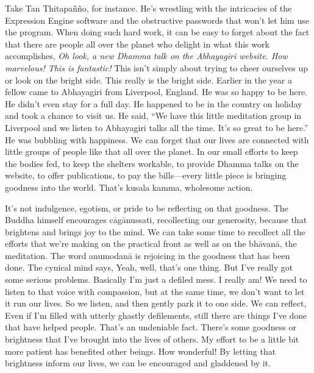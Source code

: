Take Tan Thitapañño, for instance. He's wrestling with the 
intricacies of the Expression Engine software and the obstructive 
passwords that won't let him use the program. When doing such hard 
work, it can be easy to forget about the fact that there are people all 
over the planet who delight in what this work accomplishes, \emph{Oh 
look, a new Dhamma talk on the Abhayagiri website. How marvelous! This 
is fantastic!} This isn't simply about trying to cheer ourselves up or 
look on the bright side. This really is the bright side. Earlier in the 
year a fellow came to Abhayagiri from Liverpool, England. He was so 
happy to be here. He didn't even stay for a full day. He happened to be 
in the country on holiday and took a chance to visit us. He said, ``We 
have this little meditation group in Liverpool and we listen to 
Abhayagiri talks all the time. It's so great to be here.'' He was 
bubbling with happiness. We can forget that our lives are connected 
with little groups of people like that all over the planet. In our 
small efforts to keep the bodies fed, to keep the shelters workable, to 
provide Dhamma talks on the website, to offer publications, to pay the 
bills---every little piece is bringing goodness into the world. That's 
kusala kamma, wholesome action.

It's not indulgence, egotism, or pride to be reflecting on that 
goodness. The Buddha himself encourages cāgānussati, recollecting our 
generosity, because that brightens and brings joy to the mind. We can 
take some time to recollect all the efforts that we're making on the 
practical front as well as on the bhāvanā, the meditation. The word 
anumodanā is rejoicing in the goodness that has been done. The cynical 
mind says, Yeah, well, that's one thing. But I've really got some 
serious problems. Basically I'm just a defiled mess. I really am! We 
need to listen to that voice with compassion, but at the same time, we 
don't want to let it run our lives. So we listen, and then gently park 
it to one side. We can reflect, Even if I'm filled with utterly ghastly 
defilements, still there are things I've done that have helped people. 
That's an undeniable fact. There's some goodness or brightness that 
I've brought into the lives of others. My effort to be a little bit 
more patient has benefited other beings. How wonderful! By letting that 
brightness inform our lives, we can be encouraged and gladdened by it.

